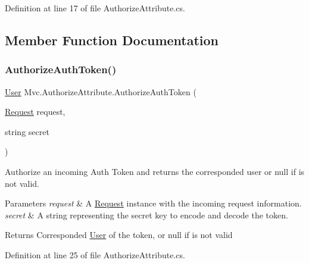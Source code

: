 Definition at line 17 of file Authorize\+Attribute.\+cs.



\subsection{Member Function Documentation}
\mbox{\label{class_mvc_1_1_authorize_attribute_a6e307e8177daede23e820c499990cf69}} 
\subsubsection{\texorpdfstring{Authorize\+Auth\+Token()}{AuthorizeAuthToken()}}
{\footnotesize\ttfamily \hyperlink{class_mvc_1_1_user}{User} Mvc.\+Authorize\+Attribute.\+Authorize\+Auth\+Token (\begin{DoxyParamCaption}\item[{\hyperlink{class_mvc_1_1_request}{Request}}]{request,  }\item[{string}]{secret }\end{DoxyParamCaption})}



Authorize an incoming Auth Token and returns the corresponded user or null if is not valid. 


\begin{DoxyParams}{Parameters}
{\em request} & A \hyperlink{class_mvc_1_1_request}{Request} instance with the incoming request information.\\
\hline
{\em secret} & A string representing the secret key to encode and decode the token.\\
\hline
\end{DoxyParams}
\begin{DoxyReturn}{Returns}
Corresponded \hyperlink{class_mvc_1_1_user}{User} of the token, or null if is not valid
\end{DoxyReturn}


Definition at line 25 of file Authorize\+Attribute.\+cs.

\mbox{\label{class_mvc_1_1_authorize_attribute_aad3c74835450cca65e86f79aca028de4}} 
